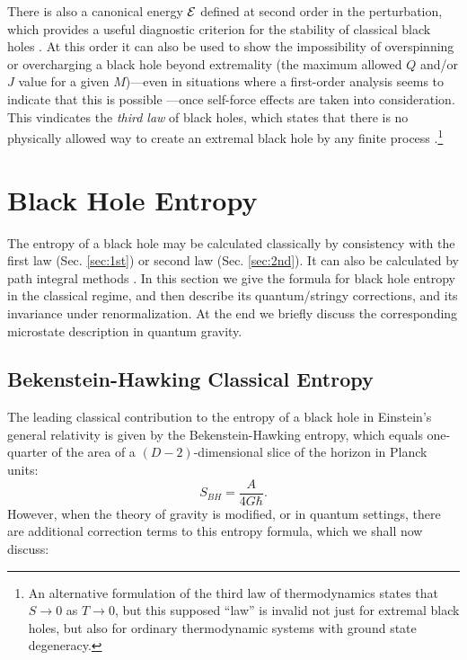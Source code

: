 \documentclass[12pt]{article}
\def\be{\begin{equation}}
\def\ee{\end{equation}}
\begin{document}

There is also a canonical energy $\cal E$ defined at second order in the perturbation, which provides a useful diagnostic criterion for the stability of classical black holes \cite{Hollands:2012sf}. At this order it can also be used to show the impossibility \cite{sorce} of overspinning or overcharging a black hole beyond extremality (the maximum allowed $Q$ and/or $J$ value for a given $M$)---even in situations where a first-order analysis seems to indicate that this is possible \cite{Hubeny:1998ga,Jacobson:2009kt}---once self-force effects are taken into consideration\cite{Zimmerman:2012zu,Barausse:2010ka,Colleoni:2015ena}.  This vindicates the \emph{third law} of black holes, which states that there is no physically allowed way to create an extremal black hole by any finite process \cite{bardeen1973four,israel}.\footnote{An alternative formulation of the third law of thermodynamics states that $S \to 0$ as $T \to 0$, but this supposed ``law'' is invalid not just for extremal black holes, but also for ordinary thermodynamic systems with ground state degeneracy.}

\section{Black Hole Entropy}\label{sec:BHent} 

The entropy of a black hole may be calculated classically by consistency with the first law (Sec. \ref{sec:1st}) or second law (Sec. \ref{sec:2nd}).  It can also be calculated by path integral methods \cite{gibbons1977action, lewkowycz}.  In this section we give the formula for black hole entropy in the classical regime, and then describe its quantum/stringy corrections, and its invariance under renormalization.  At the end we briefly discuss the corresponding microstate description in quantum gravity.

\subsection{Bekenstein-Hawking Classical Entropy}

The leading classical contribution to the entropy of a black hole in Einstein's general relativity is given by the Bekenstein-Hawking entropy, which equals one-quarter of the area of a $(D-2)$-dimensional slice of the horizon in Planck units:
\be
S_{BH} = \frac{A}{4G \hbar}.
\ee
However, when the theory of gravity is modified, or in quantum settings, there are additional correction terms to this entropy formula, which we shall now discuss:
\end{document}
